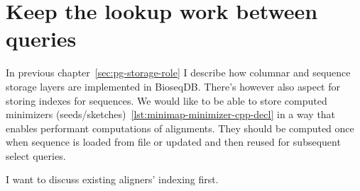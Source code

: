 \section{Keep the lookup work between queries}
\label{sec:index-storage-role}

In previous chapter~\ref{sec:pg-storage-role} I describe how columnar and sequence storage layers are implemented in BioseqDB. There's however also aspect for storing indexes for sequences.
We would like to be able to store computed minimizers (seeds/sketches)~\ref{lst:minimap-minimizer-cpp-decl} in a way that enables performant computations of alignments.
They should be computed once when sequence is loaded from file or updated and then reused for subsequent select queries.

I want to discuss existing aligners' indexing first.